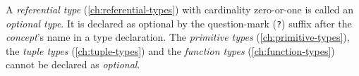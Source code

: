 A \emph{referential type} (\ref{ch:referential-types})
with cardinality zero-or-one is called an \emph{optional type}.
It is declared as optional by the question-mark (\verb|?|) suffix
after the \emph{concept}'s name in a type declaration.
The \emph{primitive types} (\ref{ch:primitive-types}),
the \emph{tuple types} (\ref{ch:tuple-types})
and the \emph{function types} (\ref{ch:function-types})
cannot be declared as \emph{optional}.
